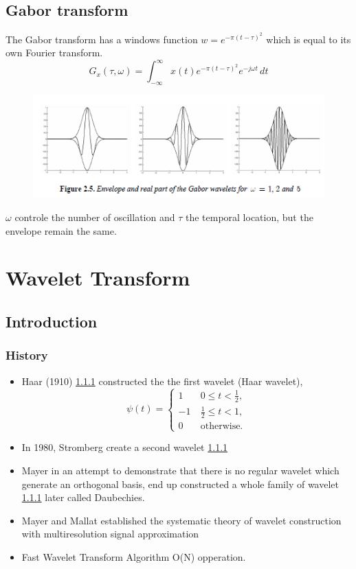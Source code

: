 \documentclass[twocolumn]{article}
\numberwithin{equation}{section}
\begin{document}
	\subsection{Gabor transform}
The Gabor transform has a windows function $w=e^{-\pi(t-\tau)^2}$ which is equal to its own Fourier transform.
$$ G_x(\tau,\omega) = \int_{-\infty}^\infty x(t)e^{-\pi(t-\tau)^2}e^{-j\omega t}\,dt $$

\begin{figure}[H]
\centering
    \includegraphics[width=.49\textwidth]{img26.png}
\end{figure}

$\omega$ controle the number of oscillation and $\tau$ the temporal location, but the envelope remain the same.


\newpage
	\section{Wavelet Transform}
		\subsection{Introduction}
			\subsubsection{History}
\begin{itemize}
	\item Haar (1910) \ref{} constructed the the first wavelet (Haar wavelet),
$$\psi(t) = \begin{cases}
  1 \quad & 0 \leq  t < \frac{1}{2},\\
 -1 & \frac{1}{2} \leq t < 1,\\
  0 &\mbox{otherwise.}
\end{cases}$$
	\item In 1980, Stromberg create a second wavelet \ref{}
	\item Mayer in an attempt to demonstrate that there is no regular wavelet which generate an orthogonal basis, end up constructed a whole family of wavelet \ref{} later called Daubechies.
	\item Mayer and Mallat established the systematic theory of wavelet construction with multiresolution signal approximation 
	\item Fast Wavelet Transform Algorithm O(N) opperation.
\end{itemize}
\end{document}
